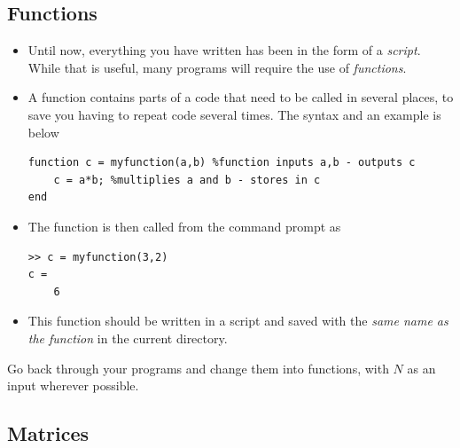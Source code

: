 \documentclass[12pt]{report}
\begin{document}
\subsection*{Functions}

\begin{itemize}
\item Until now, everything you have written has been in the form of a \textit{script}. While that is useful, many programs will require the use of \textit{functions}.
\item A function contains parts of a code that need to be called in several places, to save you having to repeat code several times. The syntax and an example is below
\begin{lstlisting}
function c = myfunction(a,b) %function inputs a,b - outputs c
	c = a*b; %multiplies a and b - stores in c
end
\end{lstlisting}
\item The function is then called from the command prompt as
\begin{lstlisting}
>> c = myfunction(3,2)
c = 
	6
\end{lstlisting}
\item This function should be written in a script and saved with the \textit{same name as the function} in the current directory.
\end{itemize}

\begin{tcolorbox}[title=Task]
  Go back through your programs and change them into functions, with $N$ as an input wherever possible.
\end{tcolorbox}

\subsection*{Matrices}
\end{document}
